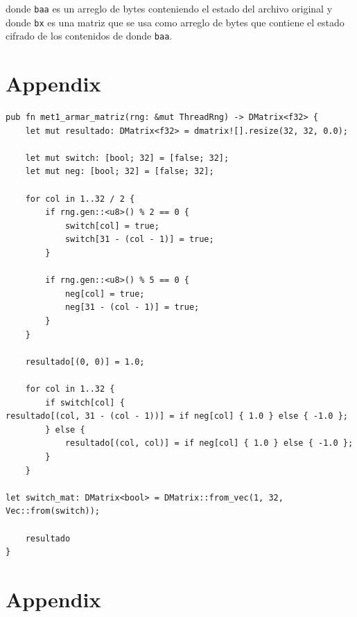 \documentclass[a4paper]{article}
\begin{document}
donde \texttt{baa} es un arreglo de bytes conteniendo el estado del archivo
original y donde \texttt{bx} es una matriz que se usa como arreglo de bytes que
contiene el estado cifrado de los contenidos de donde \texttt{baa}.

\newpage
\section{Appendix}

\begin{verbatim}
pub fn met1_armar_matriz(rng: &mut ThreadRng) -> DMatrix<f32> {
    let mut resultado: DMatrix<f32> = dmatrix![].resize(32, 32, 0.0);

    let mut switch: [bool; 32] = [false; 32];
    let mut neg: [bool; 32] = [false; 32];

    for col in 1..32 / 2 {
        if rng.gen::<u8>() % 2 == 0 {
            switch[col] = true;
            switch[31 - (col - 1)] = true;
        }

        if rng.gen::<u8>() % 5 == 0 {
            neg[col] = true;
            neg[31 - (col - 1)] = true;
        }
    }

    resultado[(0, 0)] = 1.0;

    for col in 1..32 {
        if switch[col] {
resultado[(col, 31 - (col - 1))] = if neg[col] { 1.0 } else { -1.0 };
        } else {
            resultado[(col, col)] = if neg[col] { 1.0 } else { -1.0 };
        }
    }

let switch_mat: DMatrix<bool> = DMatrix::from_vec(1, 32, Vec::from(switch));

    resultado
}
\end{verbatim}

\newpage
\section{Appendix}
\end{document}
